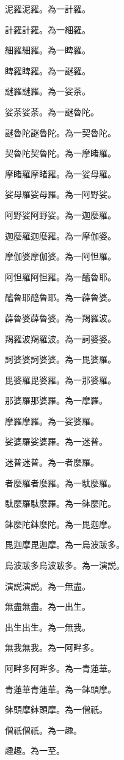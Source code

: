 泥羅泥羅。為一計羅。\par
計羅計羅。為一細羅。\par
細羅細羅。為一睥羅。\par
睥羅睥羅。為一謎羅。\par
謎羅謎羅。為一娑\xksj@RA 荼。\par
娑\xksj@RA 荼娑\xksj@RA 荼。為一謎魯陀。\par
謎魯陀謎魯陀。為一契魯陀。\par
契魯陀契魯陀。為一摩睹羅。\par
摩睹羅摩睹羅。為一娑母羅。\par
娑母羅娑母羅。為一阿野娑。\par
阿野娑阿野娑。為一迦麼羅。\par
迦麼羅迦麼羅。為一摩伽婆。\par
摩伽婆摩伽婆。為一阿怛羅。\par
阿怛羅阿怛羅。為一醯魯耶。\par
醯魯耶醯魯耶。為一薜魯婆。\par
薜魯婆薜魯婆。為一羯羅波。\par
羯羅波羯羅波。為一訶婆婆。\par
訶婆婆訶婆婆。為一毘婆羅。\par
毘婆羅毘婆羅。為一那婆羅。\par
那婆羅那婆羅。為一摩\xksj@RA 羅。\par
摩\xksj@RA 羅摩\xksj@RA 羅。為一娑婆羅。\par
娑婆羅娑婆羅。為一迷\xksj@RA 普。\par
迷\xksj@RA 普迷\xksj@RA 普。為一者麼羅。\par
者麼羅者麼羅。為一駄麼羅。\par
駄麼羅駄麼羅。為一鉢\xksj@RA 麼陀。\par
鉢\xksj@RA 麼陀鉢\xksj@RA 麼陀。為一毘迦摩。\par
毘迦摩毘迦摩。為一烏波跋多。\par
烏波跋多烏波跋多。為一演説。\par
演説演説。為一無盡。\par
無盡無盡。為一出生。\par
出生出生。為一無我。\par
無我無我。為一阿畔多。\par
阿畔多阿畔多。為一青蓮華。\par
青蓮華青蓮華。為一鉢頭摩。\par
鉢頭摩鉢頭摩。為一僧祇。\par
僧祇僧祇。為一趣。\par
趣趣。為一至。\par
